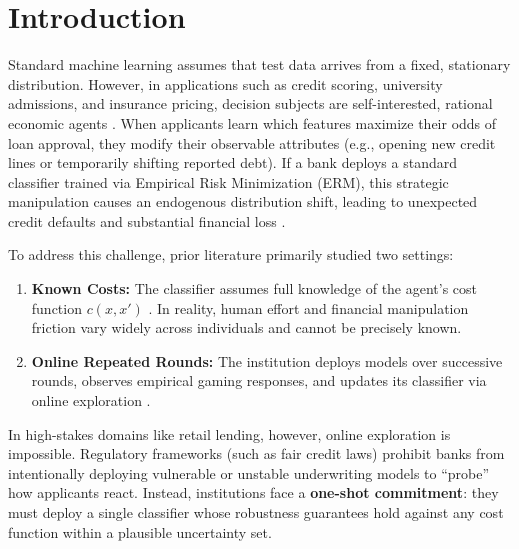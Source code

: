 \documentclass[10pt, letterpaper]{article}
\begin{document}
\section{Introduction}
\label{sec:intro}

Standard machine learning assumes that test data arrives from a fixed, stationary distribution. However, in applications such as credit scoring, university admissions, and insurance pricing, decision subjects are self-interested, rational economic agents \cite{hardt2016strategic}. When applicants learn which features maximize their odds of loan approval, they modify their observable attributes (e.g., opening new credit lines or temporarily shifting reported debt). If a bank deploys a standard classifier trained via Empirical Risk Minimization (ERM), this strategic manipulation causes an endogenous distribution shift, leading to unexpected credit defaults and substantial financial loss \cite{perdomo2020performative}.

To address this challenge, prior literature primarily studied two settings:
\begin{enumerate}[leftmargin=*]
    \item \textbf{Known Costs:} The classifier assumes full knowledge of the agent's cost function $c(x, x')$ \cite{hardt2016strategic, levanon2021strategic}. In reality, human effort and financial manipulation friction vary widely across individuals and cannot be precisely known.
    \item \textbf{Online Repeated Rounds:} The institution deploys models over successive rounds, observes empirical gaming responses, and updates its classifier via online exploration \cite{dong2018strategic, lin2023strategic}.
\end{enumerate}

In high-stakes domains like retail lending, however, online exploration is impossible. Regulatory frameworks (such as fair credit laws) prohibit banks from intentionally deploying vulnerable or unstable underwriting models to ``probe'' how applicants react. Instead, institutions face a \textbf{one-shot commitment}: they must deploy a single classifier whose robustness guarantees hold against any cost function within a plausible uncertainty set.
\end{document}
